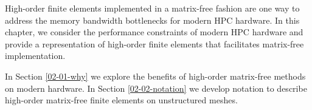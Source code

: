 High-order finite elements implemented in a matrix-free fashion are one way to address the memory bandwidth bottlenecks for modern HPC hardware.
In this chapter, we consider the performance constraints of modern HPC hardware and provide a representation of high-order finite elements that facilitates matrix-free implementation.

In Section \ref{02-01-why} we explore the benefits of high-order matrix-free methods on modern hardware.
In Section \ref{02-02-notation} we develop notation to describe high-order matrix-free finite elements on unstructured meshes.
